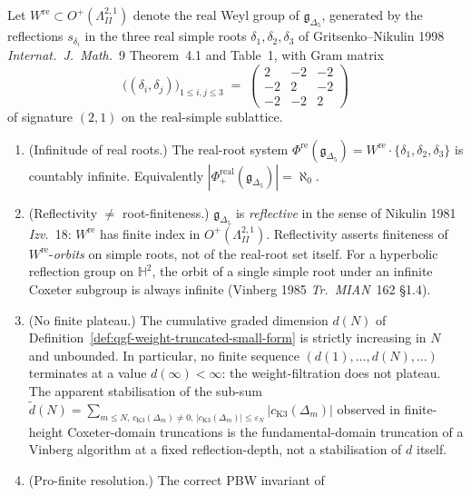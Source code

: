 \begin{theorem}
\label{thm:qgf-real-root-infinitude-no-plateau}
Let $W^{\mathrm{re}}\subset O^+(\Lambda^{2,1}_{II})$ denote the real
Weyl group of $\mathfrak g_{\Delta_5}$, generated by the reflections
$s_{\delta_i}$ in the three real simple roots $\delta_1,\delta_2,\delta_3$
of Gritsenko--Nikulin 1998 \emph{Internat.~J.~Math.}~9 Theorem~4.1 and
Table~1, with Gram matrix
\[
 \bigl((\delta_i,\delta_j)\bigr)_{1\le i,j\le 3}
 \;=\;
 \begin{pmatrix}
 2 & -2 & -2\\
 -2 & 2 & -2\\
 -2 & -2 & 2
 \end{pmatrix}
\]
of signature $(2,1)$ on the real-simple sublattice.
\begin{enumerate}[label=\textup{(\roman*)}]
 \item (Infinitude of real roots.) The real-root system
 $\Phi^{\mathrm{re}}(\mathfrak g_{\Delta_5})
 =W^{\mathrm{re}}\cdot\{\delta_1,\delta_2,\delta_3\}$
 is countably infinite. Equivalently
 $|\Phi^{\mathrm{real}}_+(\mathfrak g_{\Delta_5})|=\aleph_0$.
 \item (Reflectivity $\neq$ root-finiteness.) $\mathfrak g_{\Delta_5}$ is
 \emph{reflective} in the sense of Nikulin 1981 \emph{Izv.}~18:
 $W^{\mathrm{re}}$ has finite index in $O^+(\Lambda^{2,1}_{II})$.
 Reflectivity asserts finiteness of $W^{\mathrm{re}}$-\emph{orbits}
 on simple roots, not of the real-root set itself. For a
 hyperbolic reflection group on $\mathbb H^2$, the orbit of a
 single simple root under an infinite Coxeter subgroup is always
 infinite (Vinberg 1985 \emph{Tr.~MIAN}~162 \S1.4).
 \item (No finite plateau.) The cumulative graded dimension $d(N)$ of
 Definition~\ref{def:qgf-weight-truncated-small-form} is strictly
 increasing in $N$ and unbounded. In particular, no finite
 sequence $(d(1),\ldots,d(N),\ldots)$ terminates at a value
 $d(\infty)<\infty$: the weight-filtration does not plateau. The
 apparent stabilisation of the sub-sum
 $\widetilde d(N)=\sum_{m\le N,\,c_{\mathrm{K3}}(\Delta_m)
 \neq 0,\,|c_{\mathrm{K3}}(\Delta_m)|\le\varepsilon_N}|c_{\mathrm{K3}}
 (\Delta_m)|$ observed in finite-height Coxeter-domain truncations
 is the fundamental-domain truncation of a Vinberg algorithm at a
 fixed reflection-depth, not a stabilisation of $d$ itself.
 \item (Pro-finite resolution.) The correct PBW invariant of

\end{enumerate}
\end{theorem}
